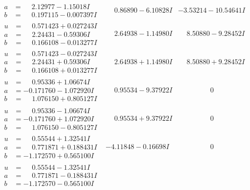 \documentclass[1p]{elsarticle_modified}
\theoremstyle{definition}
\begin{document}
$$\begin{array}{c|c|c}
\begin{aligned}
a &= \phantom{-}2.12977 - 1.15018 I \\
b &= \phantom{-}0.197115 - 0.007397 I\end{aligned}
 & \phantom{-}0.86890 - 6.10828 I & -3.53214 - 10.54641 I \\ \hline\begin{aligned}
u &= \phantom{-}0.571423 + 0.027243 I \\
a &= \phantom{-}2.24431 - 0.59306 I \\
b &= \phantom{-}0.166108 - 0.013277 I\end{aligned}
 & \phantom{-}2.64938 - 1.14980 I & \phantom{-}8.50880 - 9.28452 I \\ \hline\begin{aligned}
u &= \phantom{-}0.571423 - 0.027243 I \\
a &= \phantom{-}2.24431 + 0.59306 I \\
b &= \phantom{-}0.166108 + 0.013277 I\end{aligned}
 & \phantom{-}2.64938 + 1.14980 I & \phantom{-}8.50880 + 9.28452 I \\ \hline\begin{aligned}
u &= \phantom{-}0.95336 + 1.06674 I \\
a &= -0.171760 - 1.072920 I \\
b &= \phantom{-}1.076150 + 0.805127 I\end{aligned}
 & \phantom{-}0.95534 - 9.37922 I & \phantom{-0.000000 } 0 \\ \hline\begin{aligned}
u &= \phantom{-}0.95336 - 1.06674 I \\
a &= -0.171760 + 1.072920 I \\
b &= \phantom{-}1.076150 - 0.805127 I\end{aligned}
 & \phantom{-}0.95534 + 9.37922 I & \phantom{-0.000000 } 0 \\ \hline\begin{aligned}
u &= \phantom{-}0.55544 + 1.32541 I \\
a &= \phantom{-}0.771871 + 0.188431 I \\
b &= -1.172570 + 0.565100 I\end{aligned}
 & -4.11848 - 0.16698 I & \phantom{-0.000000 } 0 \\ \hline\begin{aligned}
u &= \phantom{-}0.55544 - 1.32541 I \\
a &= \phantom{-}0.771871 - 0.188431 I \\
b &= -1.172570 - 0.565100 I\end{aligned}

\end{array}$$
\end{document}
